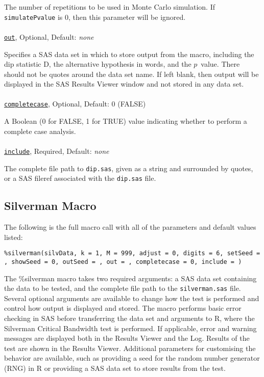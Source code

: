 \documentclass[]{interact}
\theoremstyle{plain}%
\theoremstyle{definition}
\theoremstyle{remark}
\begin{document}
The number of repetitions to be used in Monte Carlo simulation. If \texttt{simulatePvalue} is 0, then this parameter will be ignored.

\paragraph*{}
\texttt{\underline{out}}, Optional, Default: \textit{none}

Specifies a SAS data set in which to store output from the macro, including the dip statistic D, the alternative hypothesis in words, and the $p$~value. There should not be quotes around the data set name. If left blank, then output will be displayed in the SAS Results Viewer window and not stored in any data set.

\paragraph*{}
\texttt{\underline{completecase}}, Optional, Default: 0 (FALSE)

A Boolean (0 for FALSE, 1 for TRUE) value indicating whether to perform a complete case analysis.

\paragraph*{}
\texttt{\underline{include}}, Required, Default: \textit{none}

The complete file path to \texttt{dip.sas}, given as a string and surrounded by quotes, or a SAS fileref associated with the \texttt{dip.sas} file.

\subsection{Silverman Macro}
The following is the full macro call with all of the parameters and default values listed:

\texttt{\%silverman(silvData, k = 1, M = 999, adjust = 0, digits = 6, setSeed = , showSeed = 0, outSeed = , out = , completecase = 0, include = )}

The \%silverman macro takes two required arguments: a SAS data set containing the data to be tested, and the complete file path to the \texttt{silverman.sas} file. Several optional arguments are available to change how the test is performed and control how output is displayed and stored. The macro performs basic error checking in SAS before transferring the data set and arguments to R, where the Silverman Critical Bandwidth test is performed. If applicable, error and warning messages are displayed both in the Results Viewer and the Log. Results of the test are shown in the Results Viewer. Additional parameters for customising the behavior are available, such as providing a seed for the random number generator (RNG) in R or providing a SAS data set to store results from the test.
\end{document}
